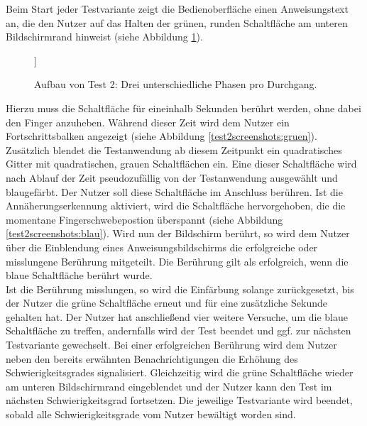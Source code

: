 \documentclass[12pt,numbers=noenddot,parskip,bibliography=totocnumbered,listof=totocnumbered]{scrreprt}
\begin{document}
Beim Start jeder Testvariante zeigt die Bedienoberfläche einen Anweisungstext an, die den Nutzer auf das Halten der grünen, runden Schaltfläche am unteren Bildschirmrand hinweist (siehe Abbildung \ref{test2phasen}).
\begin{figure}
\centering
{}%
\vfill
{}]%
\vfill
{}%
\caption{Aufbau von Test 2: Drei unterschiedliche Phasen pro Durchgang.}
\label{test2phasen}
\end{figure}
Hierzu muss die Schaltfläche für eineinhalb Sekunden berührt werden, ohne dabei den Finger anzuheben. Während dieser Zeit wird dem Nutzer ein Fortschrittsbalken angezeigt (siehe Abbildung \ref{test2screenshots:gruen}). Zusätzlich blendet die Testanwendung ab diesem Zeitpunkt ein quadratisches Gitter mit quadratischen, grauen Schaltflächen ein. Eine dieser Schaltfläche wird nach Ablauf der Zeit pseudozufällig von der Testanwendung ausgewählt und blaugefärbt. Der Nutzer soll diese Schaltfläche im Anschluss berühren. Ist die Annäherungserkennung aktiviert, wird die Schaltfläche hervorgehoben, die die momentane Fingerschwebepostion überspannt (siehe Abbildung \ref{test2screenshots:blau}). Wird nun der Bildschirm berührt, so wird dem Nutzer über die Einblendung eines Anweisungsbildschirms die erfolgreiche oder misslungene Berührung mitgeteilt. Die Berührung gilt als erfolgreich, wenn die blaue Schaltfläche berührt wurde.\\
Ist die Berührung misslungen, so wird die Einfärbung solange zurückgesetzt, bis der Nutzer die grüne Schaltfläche erneut und für eine zusätzliche Sekunde gehalten hat. Der Nutzer hat anschließend vier weitere Versuche, um die blaue Schaltfläche zu treffen, andernfalls wird der Test beendet und ggf. zur nächsten Testvariante gewechselt. Bei einer erfolgreichen Berührung wird dem Nutzer neben den bereits erwähnten Benachrichtigungen die Erhöhung des Schwierigkeitsgrades signalisiert. Gleichzeitig wird die grüne Schaltfläche wieder am unteren Bildschirmrand eingeblendet und der Nutzer kann den Test im nächsten Schwierigkeitsgrad fortsetzen. Die jeweilige Testvariante wird beendet, sobald alle Schwierigkeitsgrade vom Nutzer bewältigt worden sind.
\end{document}
